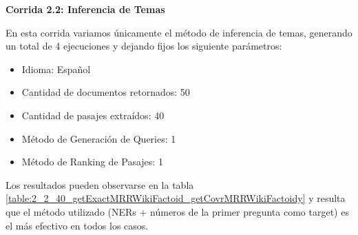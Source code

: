 \textbf{Corrida 2.2: Inferencia de Temas}\newline

En esta corrida variamos únicamente el método de inferencia de temas, generando un total de 4 ejecuciones y dejando fijos los siguiente parámetros: \newline


\begin{itemize}
  \item Idioma: Español
  \item Cantidad de documentos retornados: 50
  \item Cantidad de pasajes extraídos: 40
  \item Método de Generación de Queries: 1
  \item Método de Ranking de Pasajes: 1
\end{itemize}

Los resultados pueden observarse en la tabla \ref{table:2_2_40_getExactMRRWikiFactoid_getCovrMRRWikiFactoidy} y resulta que el método utilizado (NERs + números de la primer pregunta como target) es el más efectivo en todos los casos.\newline

